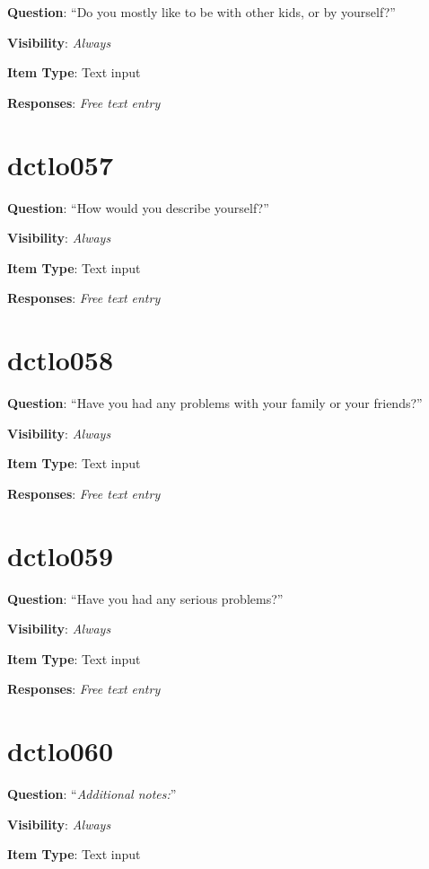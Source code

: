 \documentclass[]{book}
\begin{document}
\textbf{Question}: ``Do you mostly like to be with other kids, or by yourself?''

\textbf{Visibility}: \emph{Always}

\textbf{Item Type}: Text input

\textbf{Responses}: \emph{Free text entry}

\hypertarget{dctlo057}{%
\section{dctlo057}\label{dctlo057}}

\textbf{Question}: ``How would you describe yourself?''

\textbf{Visibility}: \emph{Always}

\textbf{Item Type}: Text input

\textbf{Responses}: \emph{Free text entry}

\hypertarget{dctlo058}{%
\section{dctlo058}\label{dctlo058}}

\textbf{Question}: ``Have you had any problems with your family or your friends?''

\textbf{Visibility}: \emph{Always}

\textbf{Item Type}: Text input

\textbf{Responses}: \emph{Free text entry}

\hypertarget{dctlo059}{%
\section{dctlo059}\label{dctlo059}}

\textbf{Question}: ``Have you had any serious problems?''

\textbf{Visibility}: \emph{Always}

\textbf{Item Type}: Text input

\textbf{Responses}: \emph{Free text entry}

\hypertarget{dctlo060}{%
\section{dctlo060}\label{dctlo060}}

\textbf{Question}: ``\emph{Additional notes:}''

\textbf{Visibility}: \emph{Always}

\textbf{Item Type}: Text input
\end{document}
